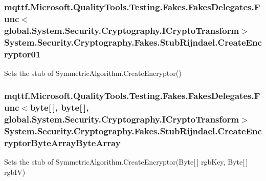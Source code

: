\hypertarget{class_system_1_1_security_1_1_cryptography_1_1_fakes_1_1_stub_rijndael_a6bc0a4a1214f145a1ad651c6f386282f}{
\subsubsection[{Create\-Encryptor01}]{\setlength{\rightskip}{0pt plus 5cm}mqttf.\-Microsoft.\-Quality\-Tools.\-Testing.\-Fakes.\-Fakes\-Delegates.\-Func$<$global.\-System.\-Security.\-Cryptography.\-I\-Crypto\-Transform$>$ System.\-Security.\-Cryptography.\-Fakes.\-Stub\-Rijndael.\-Create\-Encryptor01}}\label{class_system_1_1_security_1_1_cryptography_1_1_fakes_1_1_stub_rijndael_a6bc0a4a1214f145a1ad651c6f386282f}


Sets the stub of Symmetric\-Algorithm.\-Create\-Encryptor()

\hypertarget{class_system_1_1_security_1_1_cryptography_1_1_fakes_1_1_stub_rijndael_a2852090c06b5ad02395c70c86a19011d}{
\subsubsection[{Create\-Encryptor\-Byte\-Array\-Byte\-Array}]{\setlength{\rightskip}{0pt plus 5cm}mqttf.\-Microsoft.\-Quality\-Tools.\-Testing.\-Fakes.\-Fakes\-Delegates.\-Func$<$byte\mbox{[}$\,$\mbox{]}, byte\mbox{[}$\,$\mbox{]}, global.\-System.\-Security.\-Cryptography.\-I\-Crypto\-Transform$>$ System.\-Security.\-Cryptography.\-Fakes.\-Stub\-Rijndael.\-Create\-Encryptor\-Byte\-Array\-Byte\-Array}}\label{class_system_1_1_security_1_1_cryptography_1_1_fakes_1_1_stub_rijndael_a2852090c06b5ad02395c70c86a19011d}


Sets the stub of Symmetric\-Algorithm.\-Create\-Encryptor(\-Byte\mbox{[}$\,$\mbox{]} rgb\-Key, Byte\mbox{[}$\,$\mbox{]} rgb\-I\-V)

